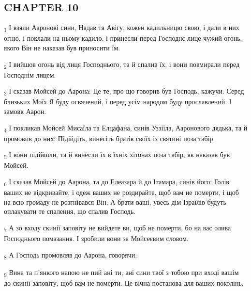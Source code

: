 \subsection{CHAPTER 10}
\begin{tcolorbox}
\textsubscript{1} І взяли Ааронові сини, Надав та Авігу, кожен кадильницю свою, і дали в них огню, і поклали на ньому кадило, і принесли перед Господнє лице чужий огонь, якого Він не наказав був приносити їм.
\end{tcolorbox}
\begin{tcolorbox}
\textsubscript{2} І вийшов огонь від лиця Господнього, та й спалив їх, і вони повмирали перед Господнім лицем.
\end{tcolorbox}
\begin{tcolorbox}
\textsubscript{3} І сказав Мойсей до Аарона: Це те, про що говорив був Господь, кажучи: Серед близьких Моїх Я буду освячений, і перед усім народом буду прославлений. І замовк Аарон.
\end{tcolorbox}
\begin{tcolorbox}
\textsubscript{4} І покликав Мойсей Мисаїла та Елцафана, синів Уззіїла, Ааронового дядька, та й промовив до них: Підійдіть, винесіть братів своїх із святині поза табір.
\end{tcolorbox}
\begin{tcolorbox}
\textsubscript{5} І вони підійшли, та й винесли їх в їхніх хітонах поза табір, як наказав був Мойсей.
\end{tcolorbox}
\begin{tcolorbox}
\textsubscript{6} І сказав Мойсей до Аарона, та до Елеазара й до Ітамара, синів його: Голів ваших не відкривайте, і одеж ваших не роздирайте, щоб вам не померти, і щоб на всю громаду не розгнівався Він. А брати ваші, увесь дім Ізраїлів будуть оплакувати те спалення, що спалив Господь.
\end{tcolorbox}
\begin{tcolorbox}
\textsubscript{7} А зо входу скинії заповіту не вийдете ви, щоб не померти, бо на вас олива Господнього помазання. І зробили вони за Мойсеєвим словом.
\end{tcolorbox}
\begin{tcolorbox}
\textsubscript{8} А Господь промовляв до Аарона, говорячи:
\end{tcolorbox}
\begin{tcolorbox}
\textsubscript{9} Вина та п'янкого напою не пий ані ти, ані сини твої з тобою при вході вашім до скинії заповіту, щоб вам не померти. Це вічна постанова для ваших поколінь,
\end{tcolorbox}
